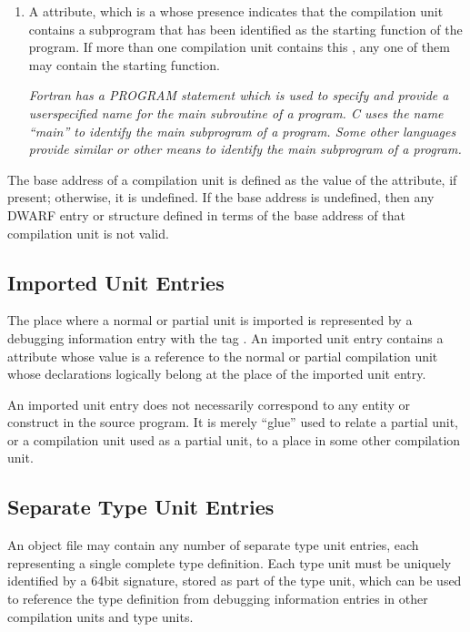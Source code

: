 \begin{enumerate}[1]
\item A  attribute, which is a 
whose presence indicates that the compilation unit contains a
subprogram that has been identified as the starting function
of the program. If more than one compilation unit contains
this , any one of them may contain the starting function.

\textit{Fortran has a PROGRAM statement which is used
to specify and provide a user\dash specified name for the main
subroutine of a program. C uses the name “main” to identify
the main subprogram of a program. Some other languages provide
similar or other means to identify the main subprogram of
a program.}

\end{enumerate}

The  base address of a compilation unit is defined as the
value of the  attribute, if present; otherwise,
it is undefined. If the base address is undefined, then any
DWARF entry or structure defined in terms of the base address
of that compilation unit is not valid.


\subsection{Imported Unit Entries}
\label{chap:importedunitentries}
The place where a normal or partial unit is imported is
represented by a debugging information entry with the 
tag . 
An imported unit entry contains a
 attribute whose value is a reference to the
normal or partial compilation unit whose declarations logically
belong at the place of the imported unit entry.

An imported unit entry does not necessarily correspond to
any entity or construct in the source program. It is merely
“glue” used to relate a partial unit, or a compilation
unit used as a partial unit, to a place in some other
compilation unit.

\subsection{Separate Type Unit Entries}
\label{chap:separatetypeunitentries}
An object file may contain any number of separate type
unit entries, each representing a single complete type
definition. Each type unit must be uniquely identified by
a 64\dash bit signature, stored as part of the type unit, which
can be used to reference the type definition from debugging
information entries in other compilation units and type units.

